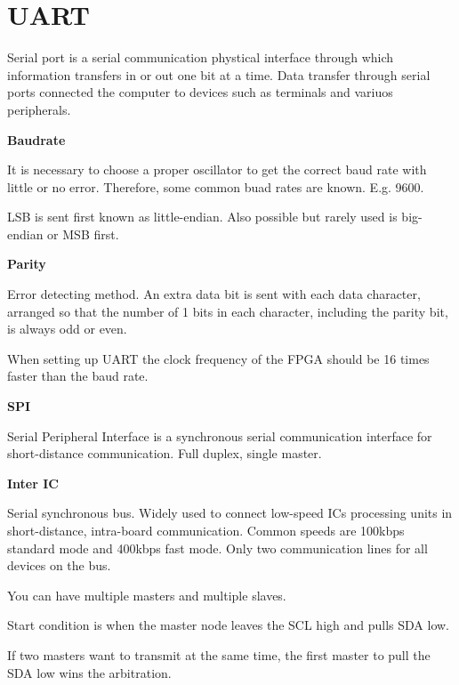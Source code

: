 \section{UART}

Serial port is a serial communication phystical interface
through which information transfers in or out one bit at a time.
Data transfer through serial ports connected the computer
to devices such as terminals and variuos peripherals.

\textbf{Baudrate}

It is necessary to choose a proper oscillator to get the
correct baud rate with little or no error. Therefore, some common buad
rates are known. E.g. 9600.

LSB is sent first known as little-endian. Also possible but
rarely used is big-endian or MSB first.

\textbf{Parity}

Error detecting method. An extra data bit is sent with each data
character, arranged so that the number of 1 bits in each character,
including the parity bit, is always odd or even.

When setting up UART the clock frequency of the FPGA should be 16 times faster
than the baud rate.


\textbf{SPI}

Serial Peripheral Interface is a synchronous serial communication interface
for short-distance communication.
Full duplex, single master.



\textbf{Inter IC}

Serial synchronous bus. Widely used to connect low-speed ICs processing
units in short-distance, intra-board communication.
Common speeds are 100kbps standard mode and 400kbps fast mode.
Only two communication lines for all devices on the bus.

You can have multiple masters and multiple slaves.

Start condition is when the master node leaves the SCL high and
pulls SDA low.

If two masters want to transmit at the same time, the
first master to pull the SDA low wins the arbitration.
